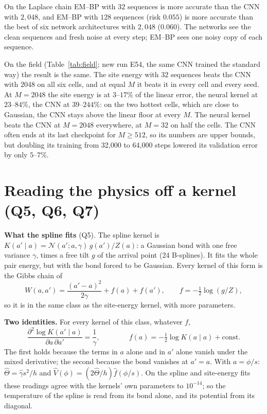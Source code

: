\documentclass[11pt,a4paper]{article}
\begin{document}
On the Laplace chain EM--BP with $32$ sequences is more accurate than the CNN with $2{,}048$, and EM--BP with $128$ sequences
(risk $0.055$) is more accurate than the best of six network architectures with $2{,}048$ ($0.060$). The networks see the
clean sequences and fresh noise at every step; EM--BP sees one noisy copy of each sequence.

On the field (Table~\ref{tab:field}; new run E54, the same CNN trained the standard way) the result is the same. The site energy
with $32$ sequences beats the CNN with $2048$ on all six cells, and at equal $M$ it beats it in every cell and every seed. At
$M=2048$ the site energy is at $3$--$17\%$ of the linear error, the neural kernel at $23$--$84\%$, the CNN at $39$--$244\%$: on
the two hottest cells, which are close to Gaussian, the CNN stays above the linear floor at every $M$. The neural kernel beats the
CNN at $M=2048$ everywhere, at $M=32$ on half the cells. The CNN often ends at its last checkpoint for $M\ge512$, so its numbers
are upper bounds, but doubling its training from 32{,}000 to 64{,}000 steps lowered its validation error by only $5$--$7\%$.



\section{Reading the physics off a kernel (Q5, Q6, Q7)}

\textbf{What the spline fits} (Q5). The spline kernel is $K(a'\mid a)=\mathcal N(a';a,\gamma)\,g(a')/Z(a)$: a Gaussian bond with
one free variance $\gamma$, times a free tilt $g$ of the arrival point (24 B-splines). It fits the whole pair energy, but with
the bond forced to be Gaussian. Every kernel of this form is the Gibbs chain of
\[
W(a,a')=\frac{(a'-a)^2}{2\gamma}+f(a)+f(a'),\qquad f=-\tfrac12\log(g/Z),
\]
so it is in the same class as the site-energy kernel, with more parameters.

\textbf{Two identities.} For every kernel of this class, whatever $f$,
\[
\frac{\partial^2\log K(a'\mid a)}{\partial a\,\partial a'}=\frac1\gamma,\qquad\qquad f(a)=-\tfrac12\log K(a\mid a)+\text{const}.
\]
The first holds because the terms in $a$ alone and in $a'$ alone vanish under the mixed derivative; the second because the bond
vanishes at $a'=a$. With $a=\phi/s$: $\hat\Theta=\hat\gamma s^2/h$ and $\hat V(\phi)=(2\hat\Theta/h)\hat f(\phi/s)$. On the
spline and site-energy fits these readings agree with the kernels' own parameters to $10^{-14}$; so the temperature of the spline
is read from its bond alone, and its potential from its diagonal.
\end{document}
